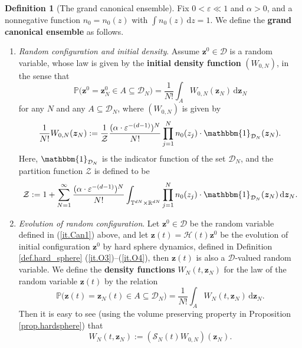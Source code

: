 \documentclass[10pt, reqno]{amsart}
\newcommand{\Pb}{\mathbb P}
\newcommand{\Rb}{\mathbb R}
\newcommand{\Tb}{\mathbb T}
\newcommand{\Dc}{\mathcal D}
\newcommand{\Hc}{\mathcal H}
\newcommand{\Sc}{\mathcal S}
\newcommand{\Zc}{\mathcal Z}
\newcommand{\vz}{\boldsymbol{z}}
\theoremstyle{definition}
\newtheorem{definition}[theorem]{Definition}
\theoremstyle{remark}
\numberwithin{equation}{section}
\begin{document}
\begin{definition}[The grand canonical ensemble] \label{def.grand_canon} Fix $0<\varepsilon\ll 1$ and $\alpha>0$, and a nonnegative function $n_0=n_0(z)$ with $\int n_0(z)\,\mathrm{d}z=1$. We define the \textbf{grand canonical ensemble} as follows.
\begin{enumerate}
\item \label{it.Can1} \emph{Random configuration and initial density}. Assume $\vz^0\in \Dc$ is a random variable, whose law is given by the \textbf{initial density function} $(W_{0,N})$, in the sense that \begin{equation}\label{eq.inti_density}
\Pb\big(\vz^0=\vz_N^0\in A\subseteq\Dc_N\big)=\frac{1}{N!}\int_{A} W_{0,N}(\vz_N)\,\mathrm{d}\vz_N
\end{equation}for any $N$ and any $A\subseteq\Dc_N$, where $(W_{0,N})$ is given by
\begin{equation}\label{eq.N_par_ensemble} \frac{1}{N!}W_{0,N}(\vz_N):=\frac{1}{\Zc}\frac{(\alpha\cdot\varepsilon^{-(d-1)})^N}{N!}\prod_{j=1}^N n_0(z_j)\cdot \mathbbm{1}_{\Dc_N}(\vz_N).
\end{equation}
Here, $\mathbbm{1}_{\Dc_N}$ is the indicator function of the set $\Dc_N$, and the partition function $\Zc$ is defined to be
\begin{equation}\label{eq.partition_func}\Zc:=1+\sum_{N=1}^\infty\frac{(\alpha\cdot\varepsilon^{-(d-1)})^N}{N!}\int_{\Tb^{dN}\times\Rb^{dN}}\prod_{j=1}^N n_0(z_j)\cdot \mathbbm{1}_{\Dc_N}(\vz_N)\,\mathrm{d}\vz_N.\end{equation}
\item \label{it.Can2}\emph{Evolution of random configuration}. Let $\vz^0\in \Dc$ be the random variable defined in (\ref{it.Can1}) above, and let $\vz(t)=\Hc(t)\vz^0$ be the evolution of initial configuration $\vz^0$ by hard sphere dynamics, defined in Definition \ref{def.hard_sphere} (\ref{it.O3})--(\ref{it.O4}), then $\vz(t)$ is also a $\Dc$-valued random variable. We define the \textbf{density functions} $W_N(t,\vz_N)$ for the law of the random variable $\vz(t)$ by the relation
\begin{equation}\label{eq.inti_density_t}
\Pb\big(\vz(t)=\vz_N(t)\in A\subseteq\Dc_N\big)=\frac{1}{N!}\int_{A} W_{N}(t,\vz_N)\,\mathrm{d}\vz_N.
\end{equation} Then it is easy to see (using the volume preserving property in Proposition \ref{prop.hardsphere}) that
\begin{equation}\label{eq.time_t_ensemble}W_N(t,\vz_N):=(\Sc_N(t)W_{0,N})(\vz_N).
\end{equation}

\end{enumerate}
\end{definition}
\end{document}
